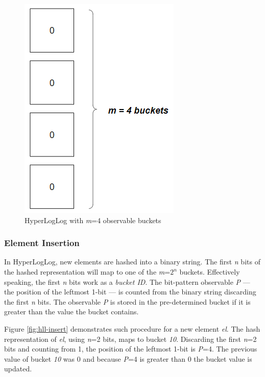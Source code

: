 \begin{figure}[!htb]
    \begin{center}
      \includegraphics[scale=0.6]{figures/hll-ds.png}
      \caption[HyperLogLog initial state]{HyperLogLog with \textit{m}=4 observable buckets}
      \label{fig:hll-ds}
    \end{center}
\end{figure}


\subsubsection*{Element Insertion}
In HyperLogLog, new elements are hashed into a binary string. The first \textit{n} bits of the hashed representation will map to one of the \textit{m}=$2^n$ buckets. Effectively speaking, the first \textit{n} bits work as a \textit{bucket ID}. The bit-pattern observable \textit{P} --- the position of the leftmost 1-bit --- is counted from the binary string discarding the first \textit{n} bits. The observable \textit{P} is stored in the pre-determined bucket if it is greater than the value the bucket contains. 

Figure \ref{fig:hll-insert} demonstrates such procedure for a new element \textit{el}. The hash representation of \textit{el}, using \textit{n}=2 bits, maps to bucket \textit{10}. Discarding the first \textit{n}=2 bits and counting from 1, the position of the leftmost 1-bit is \textit{P}=4. The previous value of bucket \textit{10} was 0 and because \textit{P}=4 is greater than 0 the bucket value is updated.


